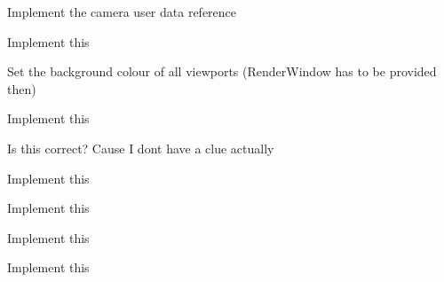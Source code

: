 \begin{DoxyRefList}
Implement the camera user data reference  
\item[\label{todo__todo000014}%
\hypertarget{todo__todo000014}{}%
Member \hyperlink{class_ogre_1_1_dot_scene_loader_a0d8466f519cf49e4177369b542da50be}{Ogre\+:\+:Dot\+Scene\+Loader\+:\+:process\+Clipping} (Ti\+Xml\+Element $\ast$\+X\+M\+L\+Node)]Implement this  
\item[\label{todo__todo000002}%
\hypertarget{todo__todo000002}{}%
Member \hyperlink{class_ogre_1_1_dot_scene_loader_a6c541dcb42d29071b2556b85f8cd1a62}{Ogre\+:\+:Dot\+Scene\+Loader\+:\+:process\+Environment} (Ti\+Xml\+Element $\ast$\+X\+M\+L\+Node)]Set the background colour of all viewports (Render\+Window has to be provided then)  
\item[\label{todo__todo000001}%
\hypertarget{todo__todo000001}{}%
Member \hyperlink{class_ogre_1_1_dot_scene_loader_a1627804a409b0dccd5598323f3d85359}{Ogre\+:\+:Dot\+Scene\+Loader\+:\+:process\+Externals} (Ti\+Xml\+Element $\ast$\+X\+M\+L\+Node)]Implement this  
\item[\label{todo__todo000011}%
\hypertarget{todo__todo000011}{}%
Member \hyperlink{class_ogre_1_1_dot_scene_loader_a3f8227871f6a283222b1d0a88076d6d8}{Ogre\+:\+:Dot\+Scene\+Loader\+:\+:process\+Look\+Target} (Ti\+Xml\+Element $\ast$\+X\+M\+L\+Node, Scene\+Node $\ast$p\+Parent)]Is this correct? Cause I don\textquotesingle{}t have a clue actually  
\item[\label{todo__todo000005}%
\hypertarget{todo__todo000005}{}%
Member \hyperlink{class_ogre_1_1_dot_scene_loader_ad23d30b2c6ee9d24dabc89b28d9b61ed}{Ogre\+:\+:Dot\+Scene\+Loader\+:\+:process\+Octree} (Ti\+Xml\+Element $\ast$\+X\+M\+L\+Node)]Implement this  
\item[\label{todo__todo000013}%
\hypertarget{todo__todo000013}{}%
Member \hyperlink{class_ogre_1_1_dot_scene_loader_a8131406550814512ea64907b598b3f1c}{Ogre\+:\+:Dot\+Scene\+Loader\+:\+:process\+Plane} (Ti\+Xml\+Element $\ast$\+X\+M\+L\+Node, Scene\+Node $\ast$p\+Parent)]Implement this  
\item[\label{todo__todo000003}%
\hypertarget{todo__todo000003}{}%
Member \hyperlink{class_ogre_1_1_dot_scene_loader_ad2f5858edce531f9a7be2e6ebdcebc5e}{Ogre\+:\+:Dot\+Scene\+Loader\+:\+:process\+Terrain} (Ti\+Xml\+Element $\ast$\+X\+M\+L\+Node)]Implement this  
\item[\label{todo__todo000004}%
\hypertarget{todo__todo000004}{}%
Member \hyperlink{class_ogre_1_1_dot_scene_loader_a24d6db1a195dea881b934753253e8e68}{Ogre\+:\+:Dot\+Scene\+Loader\+:\+:process\+User\+Data\+Reference} (Ti\+Xml\+Element $\ast$\+X\+M\+L\+Node, Scene\+Node $\ast$p\+Parent=0)]Implement this 
\end{DoxyRefList}